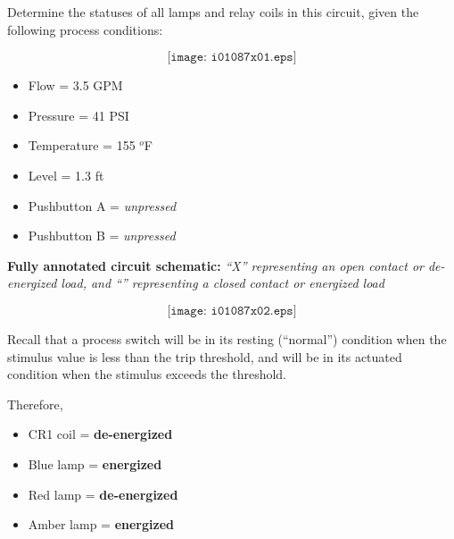 

Determine the statuses of all lamps and relay coils in this circuit, given the following process conditions:

$$\texttt{[image: i01087x01.eps]}$$

\begin{itemize}
\item{} Flow = 3.5 GPM
\item{} Pressure = 41 PSI
\item{} Temperature = 155 $^{o}$F
\item{} Level = 1.3 ft
\item{} Pushbutton A = {\it unpressed}
\item{} Pushbutton B = {\it unpressed}
\end{itemize}







\noindent
{\bf Fully annotated circuit schematic:}  {\it ``X'' representing an open contact or de-energized load, and ``'' representing a closed contact or energized load}

$$\texttt{[image: i01087x02.eps]}$$

Recall that a process switch will be in its resting (``normal'') condition when the stimulus value is less than the trip threshold, and will be in its actuated condition when the stimulus exceeds the threshold.

\vskip 10pt

Therefore,
 
\begin{itemize}
\item{} CR1 coil = {\bf de-energized}
\item{} Blue lamp = {\bf energized}
\item{} Red lamp = {\bf de-energized}
\item{} Amber lamp = {\bf energized} 
\end{itemize}










